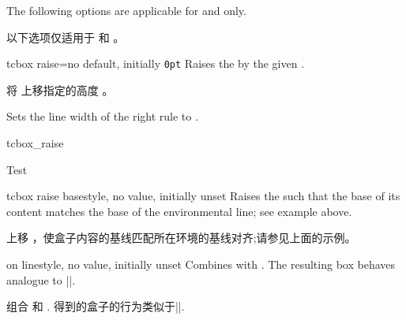 The following options are applicable for  and 
only.

以下选项仅适用于  和 。
\begin{docTcbKey}{tcbox raise}{=}{no default, initially \texttt{0pt}}
Raises the  by the given .

将  上移指定的高度 。

Sets the line width of the right rule to .
\begin{exdispExample}{tcbox_raise}

Test\dotfill
{}\dotfill
{}\dotfill
{}
\end{exdispExample}
\end{docTcbKey}



\begin{docTcbKey}{tcbox raise base}{}{style, no value, initially unset}
Raises the  such that the base of its content matches
the base of the environmental line; see example above.

上移  ，使盒子内容的基线匹配所在环境的基线对齐;请参见上面的示例。
\end{docTcbKey}

\begin{docTcbKey}{on line}{}{style, no value, initially unset}
Combines  with .
The resulting box behaves analogue to |\fbox|.

组合  和 .
得到的盒子的行为类似于|\fbox|.
\end{docTcbKey}





